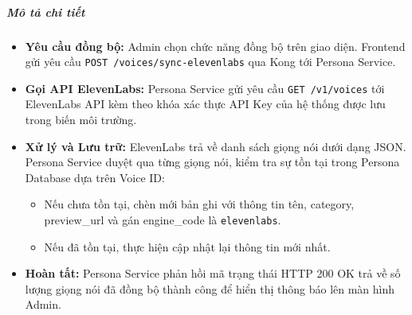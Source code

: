 \subparagraph{Mô tả chi tiết}
\begin{itemize}
\item \textbf{Yêu cầu đồng bộ:} Admin chọn chức năng đồng bộ trên giao diện. Frontend gửi yêu cầu \texttt{POST /voices/sync-elevenlabs} qua Kong tới Persona Service.
\item \textbf{Gọi API ElevenLabs:} Persona Service gửi yêu cầu \texttt{GET /v1/voices} tới ElevenLabs API kèm theo khóa xác thực API Key của hệ thống được lưu trong biến môi trường.
\item \textbf{Xử lý và Lưu trữ:} ElevenLabs trả về danh sách giọng nói dưới dạng JSON. Persona Service duyệt qua từng giọng nói, kiểm tra sự tồn tại trong Persona Database dựa trên Voice ID:
    \begin{itemize}
    \item Nếu chưa tồn tại, chèn mới bản ghi với thông tin tên, category, preview\_url và gán engine\_code là \texttt{elevenlabs}.
    \item Nếu đã tồn tại, thực hiện cập nhật lại thông tin mới nhất.
    \end{itemize}
\item \textbf{Hoàn tất:} Persona Service phản hồi mã trạng thái HTTP 200 OK trả về số lượng giọng nói đã đồng bộ thành công để hiển thị thông báo lên màn hình Admin.
\end{itemize}
